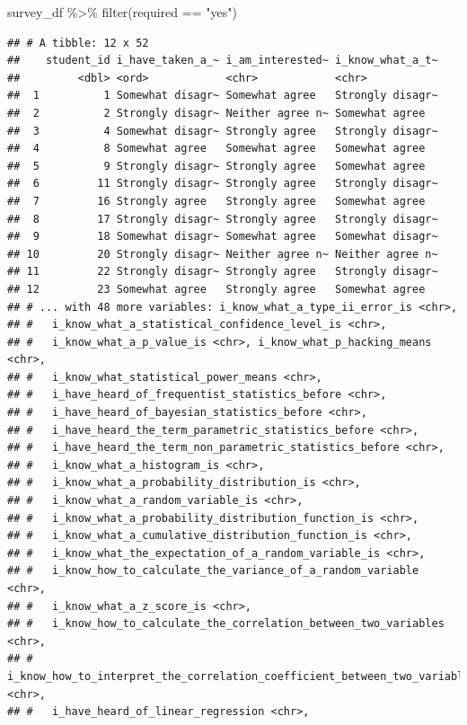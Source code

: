 \documentclass[
]{book}
\newenvironment{Shaded}{\begin{snugshade}}{\end{snugshade}}
\newcommand{\FunctionTok}[1]{\textcolor[rgb]{0.00,0.00,0.00}{#1}}
\newcommand{\NormalTok}[1]{#1}
\newcommand{\SpecialCharTok}[1]{\textcolor[rgb]{0.00,0.00,0.00}{#1}}
\newcommand{\StringTok}[1]{\textcolor[rgb]{0.31,0.60,0.02}{#1}}
\begin{document}
\begin{Shaded}
\begin{Highlighting}[]
\NormalTok{survey\_df }\SpecialCharTok{\%\textgreater{}\%} \FunctionTok{filter}\NormalTok{(required }\SpecialCharTok{==} \StringTok{"yes"}\NormalTok{)}
\end{Highlighting}
\end{Shaded}

\begin{verbatim}
## # A tibble: 12 x 52
##    student_id i_have_taken_a_~ i_am_interested~ i_know_what_a_t~
##         <dbl> <ord>            <chr>            <chr>           
##  1          1 Somewhat disagr~ Somewhat agree   Strongly disagr~
##  2          2 Strongly disagr~ Neither agree n~ Somewhat agree  
##  3          4 Somewhat disagr~ Strongly agree   Strongly disagr~
##  4          8 Somewhat agree   Somewhat agree   Somewhat agree  
##  5          9 Strongly disagr~ Strongly agree   Somewhat agree  
##  6         11 Strongly disagr~ Strongly agree   Strongly disagr~
##  7         16 Strongly agree   Strongly agree   Somewhat agree  
##  8         17 Strongly disagr~ Strongly agree   Strongly disagr~
##  9         18 Somewhat disagr~ Somewhat agree   Somewhat disagr~
## 10         20 Strongly disagr~ Neither agree n~ Neither agree n~
## 11         22 Strongly disagr~ Strongly agree   Strongly disagr~
## 12         23 Somewhat agree   Strongly agree   Somewhat agree  
## # ... with 48 more variables: i_know_what_a_type_ii_error_is <chr>,
## #   i_know_what_a_statistical_confidence_level_is <chr>,
## #   i_know_what_a_p_value_is <chr>, i_know_what_p_hacking_means <chr>,
## #   i_know_what_statistical_power_means <chr>,
## #   i_have_heard_of_frequentist_statistics_before <chr>,
## #   i_have_heard_of_bayesian_statistics_before <chr>,
## #   i_have_heard_the_term_parametric_statistics_before <chr>,
## #   i_have_heard_the_term_non_parametric_statistics_before <chr>,
## #   i_know_what_a_histogram_is <chr>,
## #   i_know_what_a_probability_distribution_is <chr>,
## #   i_know_what_a_random_variable_is <chr>,
## #   i_know_what_a_probability_distribution_function_is <chr>,
## #   i_know_what_a_cumulative_distribution_function_is <chr>,
## #   i_know_what_the_expectation_of_a_random_variable_is <chr>,
## #   i_know_how_to_calculate_the_variance_of_a_random_variable <chr>,
## #   i_know_what_a_z_score_is <chr>,
## #   i_know_how_to_calculate_the_correlation_between_two_variables <chr>,
## #   i_know_how_to_interpret_the_correlation_coefficient_between_two_variables <chr>,
## #   i_have_heard_of_linear_regression <chr>,

\end{verbatim}
\end{document}
